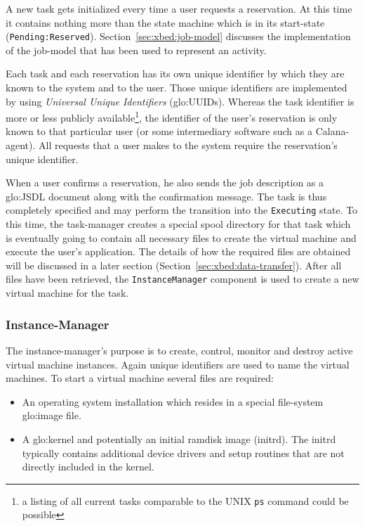 A new task gets initialized every  time a user requests a reservation. At
this time it contains nothing more  than the state machine which is in its
start-state                               (\ie \texttt{Pending:Reserved}).
Section~\ref{sec:xbed:job-model}  discusses   the  implementation  of  the
job-model that has been used to  represent an activity.

Each task and each reservation has its own unique identifier by which they
are known  to the system  and to the  user.  Those unique  identifiers are
implemented     by    using     \emph{Universal     Unique    Identifiers}
(\gls{glo:UUID}s).  Whereas  the task identifier is more  or less publicly
available\footnote{a listing  of all current tasks comparable  to the UNIX
  \texttt{ps}  command could be  possible}, the  identifier of  the user's
reservation is  only known to  that particular user (or  some intermediary
software such as  a Calana-agent). All requests that a  user makes to the
system require the reservation's unique identifier.

When a user confirms a reservation,  he also sends the job description as
a \gls{glo:JSDL}  document along with the confirmation  message.  The task
is  thus completely  specified and  may  perform the  transition into  the
\texttt{Executing} state. To this time, the task-manager creates a special
spool directory  for that  task which is  eventually going to  contain all
necessary  files to  create the  virtual  machine and  execute the  user's
application. The  details of how the  required files are  obtained will be
discussed  in   a  later  section  (Section~\ref{sec:xbed:data-transfer}).
After  all   files  have  been   retrieved,  the  \texttt{InstanceManager}
component is used to create a new virtual machine for the task.

\subsubsection{Instance-Manager}

The instance-manager's purpose is  to create, control, monitor and destroy
active virtual  machine instances.  Again  unique identifiers are  used to
name the  virtual machines. To start  a virtual machine  several files are
required:

\begin{itemize}
\item  An  operating  system  installation  which  resides  in  a  special
  file-system \gls{glo:image} file.
\item  A  \gls{glo:kernel}  and   potentially  an  initial  ramdisk  image
  (initrd). The  initrd typically  contains additional device  drivers and
  setup routines that are not directly included in the kernel.
\end{itemize}

